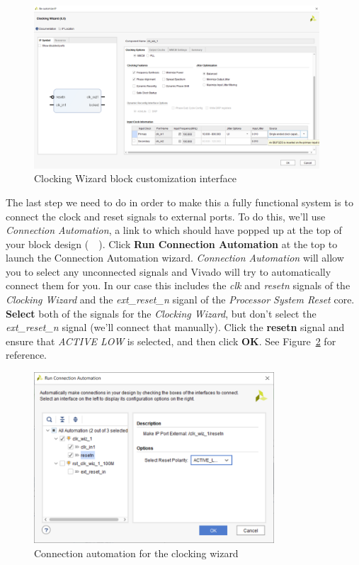 \documentclass[11pt]{article}
\begin{document}
\begin{figure}[h]
    \centering
    \includegraphics[width=0.95\textwidth]{images/customize_clock.png}
    \caption{Clocking Wizard block customization interface}
    \label{fig:customize_clock}
\end{figure}

The last step we need to do in order to make this a fully functional system is to connect the clock and reset signals to external ports. To do this, we'll use \textit{Connection Automation}, a link to which should have popped up at the top of your block design 
(~~). Click \textbf{Run Connection Automation} at the top to launch the Connection Automation wizard. \textit{Connection Automation} will allow you to select any unconnected signals and Vivado will try to automatically connect them for you. In our case this includes the \textit{clk} and \textit{resetn} signals of the \textit{Clocking Wizard} and the \textit{ext\_reset\_n} siganl of the \textit{Processor System Reset} core. \textbf{Select} both of the signals for the \textit{Clocking Wizard}, but don't select the \textit{ext\_reset\_n} signal (we'll connect that manually). Click the \textbf{resetn} signal and ensure that \textit{ACTIVE LOW} is selected, and then click \textbf{OK}. See Figure~\ref{fig:conn_auto_clock} for reference.

\begin{figure}[h]
    \centering
    \includegraphics[width=0.8\textwidth]{images/conn_auto_clock.png}
    \caption{Connection automation for the clocking wizard}
    \label{fig:conn_auto_clock}
\end{figure}
\end{document}
